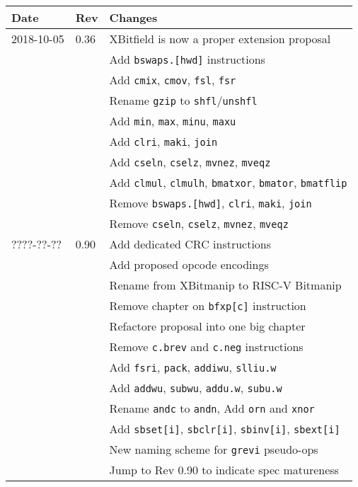 \documentclass[twoside,11pt]{book}
\begin{document}
\begin{center}
\begin{tabular}{lll}
Date & Rev & Changes \\
\hline
2018-10-05 & 0.36 & XBitfield is now a proper extension proposal \\
           &      & Add {\tt bswaps.[hwd]} instructions \\
           &      & Add {\tt cmix}, {\tt cmov}, {\tt fsl}, {\tt fsr} \\
           &      & Rename {\tt gzip} to {\tt shfl}/{\tt unshfl} \\
           &      & Add {\tt min}, {\tt max}, {\tt minu}, {\tt maxu} \\
           &      & Add {\tt clri}, {\tt maki}, {\tt join} \\
           &      & Add {\tt cseln}, {\tt cselz}, {\tt mvnez}, {\tt mveqz} \\
           &      & Add {\tt clmul}, {\tt clmulh}, {\tt bmatxor}, {\tt bmator}, {\tt bmatflip} \\
           &      & Remove {\tt bswaps.[hwd]}, {\tt clri}, {\tt maki}, {\tt join} \\
           &      & Remove {\tt cseln}, {\tt cselz}, {\tt mvnez}, {\tt mveqz} \\
\hline
????-??-?? & 0.90 & Add dedicated CRC instructions \\
           &      & Add proposed opcode encodings \\
           &      & Rename from XBitmanip to RISC-V Bitmanip \\
           &      & Remove chapter on {\tt bfxp[c]} instruction \\
           &      & Refactore proposal into one big chapter \\
           &      & Remove {\tt c.brev} and {\tt c.neg} instructions \\
           &      & Add {\tt fsri}, {\tt pack}, {\tt addiwu}, {\tt slliu.w} \\
           &      & Add {\tt addwu}, {\tt subwu}, {\tt addu.w}, {\tt subu.w} \\
           &      & Rename {\tt andc} to {\tt andn}, Add {\tt orn} and {\tt xnor} \\
           &      & Add {\tt sbset[i]}, {\tt sbclr[i]}, {\tt sbinv[i]}, {\tt sbext[i]} \\
           &      & New naming scheme for {\tt grevi} pseudo-ops \\
           &      & Jump to Rev 0.90 to indicate spec matureness \\
\hline
\end{tabular}
\end{center}



\end{document}
